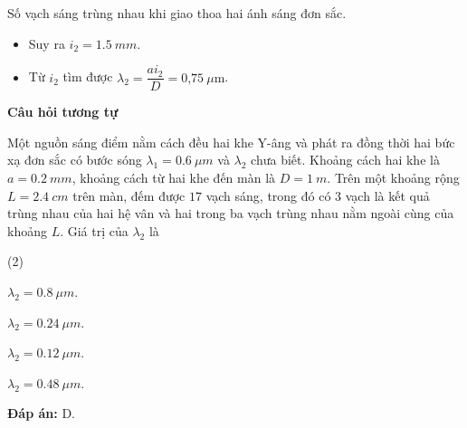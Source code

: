 \begin{dang}{Số vạch sáng trùng nhau khi giao thoa hai ánh sáng đơn sắc.}
{\begin{itemize}
	\item Suy ra $i_2= \SI{1,5}{mm}$. 
	\item Từ $i_2$ tìm được $\lambda_2 =\dfrac{ai_2}{D}=\text{0,75}\ \mu \text{m}$.
\end{itemize}

		\begin{center}
			\textbf{Câu hỏi tương tự}
		\end{center}

Một nguồn sáng điểm nằm cách đều hai khe Y-âng và phát ra đồng thời hai bức xạ đơn sắc có bước sóng $ \lambda_{1} = \SI{0,6}{\mu m} $ và $ \lambda_{2} $ chưa biết. Khoảng cách hai khe là $ a = \SI{0,2}{mm} $, khoảng cách từ hai khe đến màn là $ D = \SI{1}{m} $. Trên một khoảng rộng $ L = \SI{2,4}{cm} $ trên màn, đếm được $ 17 $ vạch sáng, trong đó có $ 3 $ vạch là kết quả trùng nhau của hai hệ vân và hai trong ba vạch trùng nhau nằm ngoài cùng của khoảng $ L $. Giá trị của $ \lambda_{2} $ là
\begin{mcq}(2)
	\item $ \lambda_{2} = \SI{0,8}{\mu m} $.
	\item $ \lambda_{2} = \SI{0,24}{\mu m} $.
	\item $ \lambda_{2} = \SI{0,12}{\mu m} $.
	\item $ \lambda_{2} = \SI{0,48}{\mu m} $.
\end{mcq}
\textbf{Đáp án:} D.
}
\end{dang}

